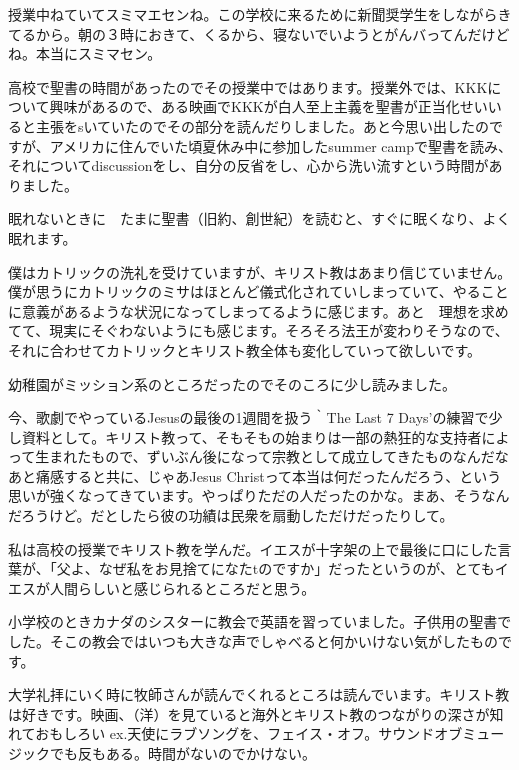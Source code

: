 \item
授業中ねていてスミマエセンね。この学校に来るために新聞奨学生をしながらきてるから。朝の３時におきて、くるから、寝ないでいようとがんバってんだけどね。本当にスミマセン。

\item
高校で聖書の時間があったのでその授業中ではあります。授業外では、KKKについて興味があるので、ある映画でKKKが白人至上主義を聖書が正当化せいいると主張をsいていたのでその部分を読んだりしました。あと今思い出したのですが、アメリカに住んでいた頃夏休み中に参加したsummer campで聖書を読み、それについてdiscussionをし、自分の反省をし、心から洗い流すという時間がありました。

\item
眠れないときに　たまに聖書（旧約、創世紀）を読むと、すぐに眠くなり、よく眠れます。

\item
僕はカトリックの洗礼を受けていますが、キリスト教はあまり信じていません。僕が思うにカトリックのミサはほとんど儀式化されていしまっていて、やることに意義があるような状況になってしまってるように感じます。あと　理想を求めてて、現実にそぐわないようにも感じます。そろそろ法王が変わりそうなので、それに合わせてカトリックとキリスト教全体も変化していって欲しいです。

\item
幼稚園がミッション系のところだったのでそのころに少し読みました。

\item
今、歌劇でやっているJesusの最後の1週間を扱う｀The Last 7 Days'の練習で少し資料として。キリスト教って、そもそもの始まりは一部の熱狂的な支持者によって生まれたもので、ずいぶん後になって宗教として成立してきたものなんだなあと痛感すると共に、じゃあJesus Christって本当は何だったんだろう、という思いが強くなってきています。やっぱりただの人だったのかな。まあ、そうなんだろうけど。だとしたら彼の功績は民衆を扇動しただけだったりして。

\item
私は高校の授業でキリスト教を学んだ。イエスが十字架の上で最後に口にした言葉が、「父よ、なぜ私をお見捨てになたtのですか」だったというのが、とてもイエスが人間らしいと感じられるところだと思う。

\item
小学校のときカナダのシスターに教会で英語を習っていました。子供用の聖書でした。そこの教会ではいつも大きな声でしゃべると何かいけない気がしたものです。

\item
大学礼拝にいく時に牧師さんが読んでくれるところは読んでいます。キリスト教は好きです。映画、（洋）を見ていると海外とキリスト教のつながりの深さが知れておもしろい ex.天使にラブソングを、フェイス・オフ。サウンドオブミュージックでも反もある。時間がないのでかけない。

